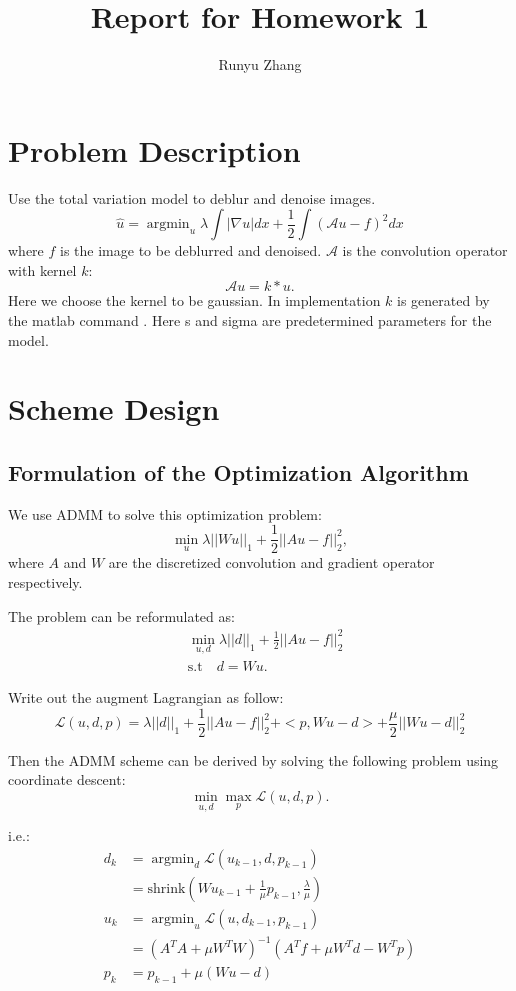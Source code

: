 \documentclass{article}
\title{Report for Homework 1}
\author{Runyu Zhang}
\theoremstyle{plain} \newtheorem{thm}{Theorem}
\newcommand{\cA}{\mathcal{A}}
\newcommand{\cL}{\mathcal{L}}
\begin{document}
	\maketitle
\section{Problem Description}
Use the total variation model to deblur and denoise images.
\begin{equation*}
	\hat{u} = \mathop{\arg\min}_u \lambda \int |\nabla u| dx + \frac{1}{2} \int (\cA u - f)^2dx
\end{equation*}
where $f$ is the image to be deblurred and denoised. $\cA$ is the convolution operator with kernel $k$:
$$\cA u = k * u.$$
Here we choose the kernel to be gaussian. In implementation $k$ is generated by the matlab command . Here s and sigma are predetermined parameters for the model.

\section{Scheme Design}
\subsection{Formulation of the Optimization Algorithm}
We use ADMM to solve this optimization problem:
$$\min_u \lambda||W u||_1 +\frac{1}{2}||A u - f||_2^2,$$
where $A$ and $W$ are the discretized convolution and gradient operator respectively.

The problem can be reformulated as:
\begin{align*}
&\min_{u, d} \lambda||d||_1 +\frac{1}{2}||A u - f||_2^2\\
&\text{s.t}\quad d = Wu.
\end{align*}

Write out the augment Lagrangian as follow:
$$\cL(u, d, p) = \lambda||d||_1 +\frac{1}{2}||A u - f||_2^2 +  <p, Wu - d> + \frac{\mu}{2} ||Wu - d||_2^2$$

Then the ADMM scheme can be derived by solving the following problem using coordinate descent:
$$\min_{u, d} \max_{p} \cL(u, d, p).$$

i.e.:
\begin{align*}
	d_k &= \mathop{\arg \min}_d \cL(u_{k-1}, d, p_{k-1})\\
		   &= \text{shrink}(Wu_{k-1} + \frac{1}{\mu}p_{k-1}, \frac{\lambda}{\mu})\\
	u_k &= \mathop{\arg \min}_u \cL(u, d_{k-1}, p_{k-1})\\
		   &= (A^TA + \mu W^TW)^{-1} (A^T f + \mu W^T d - W^T p)\\
	p_k &= p_{k-1} + \mu (Wu - d)
\end{align*}
\end{document}

